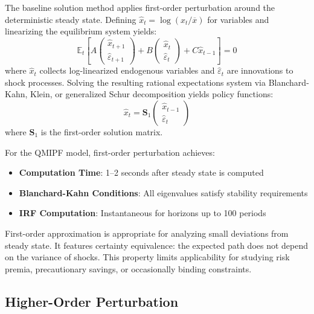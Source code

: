 \documentclass[12pt]{article}
\begin{document}
The baseline solution method applies first-order perturbation around the deterministic steady state. Defining $\hat{x}_t = \log(x_t/\overline{x})$ for variables and linearizing the equilibrium system yields:
\begin{equation}
\mathbb{E}_t \left[ A \begin{pmatrix} \hat{x}_{t+1} \\ \hat{\varepsilon}_{t+1} \end{pmatrix} + B \begin{pmatrix} \hat{x}_t \\ \hat{\varepsilon}_t \end{pmatrix} + C \hat{x}_{t-1} \right] = 0
\end{equation}
where $\hat{x}_t$ collects log-linearized endogenous variables and $\hat{\varepsilon}_t$ are innovations to shock processes. Solving the resulting rational expectations system via Blanchard-Kahn, Klein, or generalized Schur decomposition yields policy functions:
\begin{equation}
\hat{x}_t = \mathbf{S}_1 \begin{pmatrix} \hat{x}_{t-1} \\ \hat{\varepsilon}_t \end{pmatrix}
\end{equation}
where $\mathbf{S}_1$ is the first-order solution matrix.

For the QMIPF model, first-order perturbation achieves:
\begin{itemize}
\item \textbf{Computation Time}: 1--2 seconds after steady state is computed
\item \textbf{Blanchard-Kahn Conditions}: All eigenvalues satisfy stability requirements
\item \textbf{IRF Computation}: Instantaneous for horizons up to 100 periods
\end{itemize}

First-order approximation is appropriate for analyzing small deviations from steady state. It features certainty equivalence: the expected path does not depend on the variance of shocks. This property limits applicability for studying risk premia, precautionary savings, or occasionally binding constraints.

\subsection{Higher-Order Perturbation}
\end{document}
